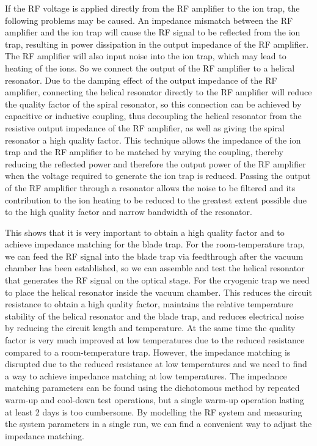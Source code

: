 If the RF voltage is applied directly from the RF amplifier to the ion trap, the following problems may be caused. An impedance mismatch between the RF amplifier and the ion trap will cause the RF signal to be reflected from the ion trap, resulting in power dissipation in the output impedance of the RF amplifier. The RF amplifier will also input noise into the ion trap, which may lead to heating of the ions. So we connect the output of the RF amplifier to a helical resonator. Due to the damping effect of the output impedance of the RF amplifier, connecting the helical resonator directly to the RF amplifier will reduce the quality factor of the spiral resonator, so this connection can be achieved by capacitive or inductive coupling, thus decoupling the helical resonator from the resistive output impedance of the RF amplifier, as well as giving the spiral resonator a high quality factor. This technique allows the impedance of the ion trap and the RF amplifier to be matched by varying the coupling, thereby reducing the reflected power and therefore the output power of the RF amplifier when the voltage required to generate the ion trap is reduced. Passing the output of the RF amplifier through a resonator allows the noise to be filtered and its contribution to the ion heating to be reduced to the greatest extent possible due to the high quality factor and narrow bandwidth of the resonator.

This shows that it is very important to obtain a high quality factor and to achieve impedance matching for the blade trap. For the room-temperature trap, we can feed the RF signal into the blade trap via feedthrough after the vacuum chamber has been established, so we can assemble and test the helical resonator that generates the RF signal on the optical stage. For the cryogenic trap we need to place the helical resonator inside the vacuum chamber. This reduces the circuit resistance to obtain a high quality factor, maintains the relative temperature stability of the helical resonator and the blade trap, and reduces electrical noise by reducing the circuit length and temperature. At the same time the quality factor is very much improved at low temperatures due to the reduced resistance compared to a room-temperature trap. However, the impedance matching is disrupted due to the reduced resistance at low temperatures and we need to find a way to achieve impedance matching at low temperatures. The impedance matching parameters can be found using the dichotomous method by repeated warm-up and cool-down test operations, but a single warm-up operation lasting at least 2 days is too cumbersome. By modelling the RF system and measuring the system parameters in a single run, we can find a convenient way to adjust the impedance matching.

